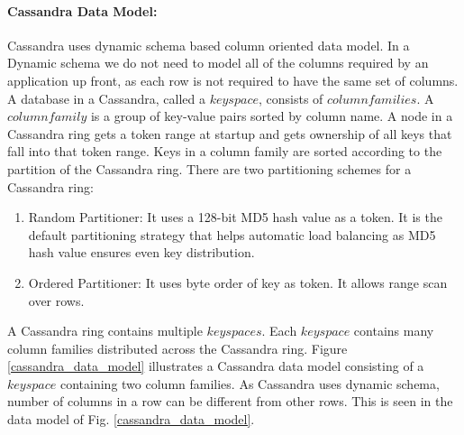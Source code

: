 	 
	 \paragraph{Cassandra Data Model:}
	  Cassandra uses dynamic schema based column oriented data model. 
	  In a Dynamic schema we do not need to model all of the columns required by an application up front, as each row is not required to have the same set of columns.
	  A database in a Cassandra, called  a $keyspace$, consists of $column families$.
	  A $column family$ is a group of key-value pairs sorted by column name. A node in a Cassandra ring gets a token range at startup and gets 
	  ownership of all keys that fall into that token range. Keys in a column family are sorted according to the partition
	  of the Cassandra ring. There are two partitioning  schemes for a Cassandra ring:
	  \begin{enumerate}
	   \item  Random Partitioner: It uses a 128-bit MD5 hash value as a token. It is the default partitioning strategy that helps automatic load balancing as MD5 hash value ensures even key distribution.
	   \item Ordered Partitioner: It uses byte order of key as token. It allows range scan over rows. %
	  \end{enumerate}

	  A Cassandra ring contains multiple $keyspaces$. Each $keyspace$ contains many column families distributed across the Cassandra ring.
	  Figure \ref{cassandra_data_model} illustrates a Cassandra data model consisting of a $keyspace$ containing two column families.
	  As Cassandra uses dynamic schema, number of columns in a row can be different from other rows. This is seen in the data model of Fig. \ref{cassandra_data_model}.

